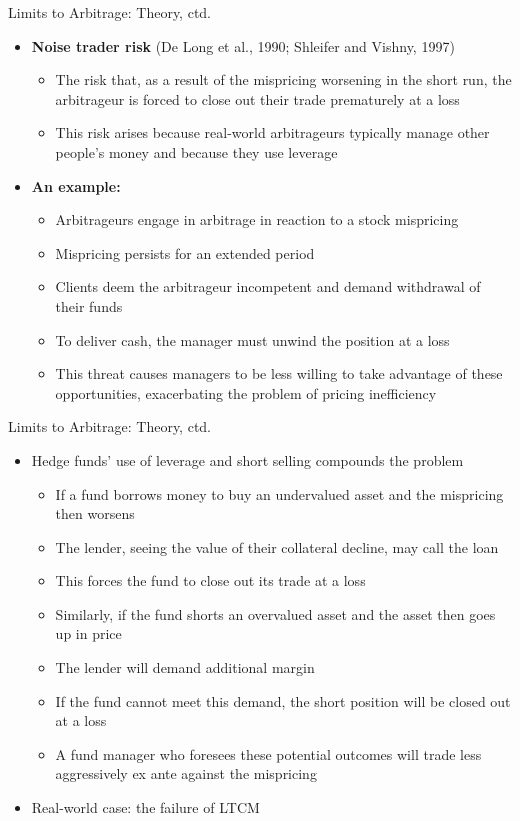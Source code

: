 \documentclass[aspectratio=169, 11pt]{beamer}
\begin{document}
\begin{frame}[shrink=5]{Limits to Arbitrage: Theory, ctd.}
\begin{itemize}
\item \textbf{Noise trader risk} (De Long et al., 1990; Shleifer and Vishny, 1997)
  \begin{itemize}
  \item The risk that, as a result of the mispricing worsening in the short run, the arbitrageur is forced to close out their trade prematurely at a loss
  \item This risk arises because real-world arbitrageurs typically manage other people's money and because they use leverage
  \end{itemize}
\item \textbf{An example:}
  \begin{itemize}
  \item Arbitrageurs engage in arbitrage in reaction to a stock mispricing
  \item Mispricing persists for an extended period
  \item Clients deem the arbitrageur incompetent and demand withdrawal of their funds
  \item To deliver cash, the manager must unwind the position at a loss
  \item This threat causes managers to be less willing to take advantage of these opportunities, exacerbating the problem of pricing inefficiency
  \end{itemize}
\end{itemize}
\end{frame}

\begin{frame}[shrink=5]{Limits to Arbitrage: Theory, ctd.}
\begin{itemize}
\item Hedge funds' use of leverage and short selling compounds the problem
  \begin{itemize}
  \item If a fund borrows money to buy an undervalued asset and the mispricing then worsens
  \item The lender, seeing the value of their collateral decline, may call the loan
  \item This forces the fund to close out its trade at a loss
  \item Similarly, if the fund shorts an overvalued asset and the asset then goes up in price
  \item The lender will demand additional margin
  \item If the fund cannot meet this demand, the short position will be closed out at a loss
  \item A fund manager who foresees these potential outcomes will trade less aggressively ex ante against the mispricing
  \end{itemize}
  \item Real-world case: the failure of LTCM
\end{itemize}
\end{frame}
\end{document}
